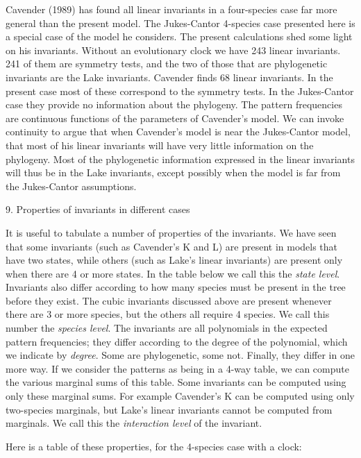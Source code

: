 Cavender (1989) has found all linear invariants in a four-species case far more
general than the present model.  The Jukes-Cantor 4-species case presented 
here is a special case of the model he considers.  The present calculations
shed some light on his invariants.  Without an evolutionary clock we have
243 linear invariants.  241 of them are symmetry tests, and the two of those 
that are phylogenetic invariants are the Lake invariants.  Cavender
finds 68 linear invariants.  In the
present case most of these correspond to the symmetry tests.  In the
Jukes-Cantor
case they provide no information about the phylogeny.  The pattern 
frequencies are continuous functions of the parameters of Cavender's model.
We can invoke continuity to argue that when Cavender's model is near the
Jukes-Cantor model, that most of his linear invariants will have very little
information on the phylogeny.  Most of the phylogenetic information expressed
in the linear invariants will thus be in the Lake invariants, except possibly
when the model is far from the Jukes-Cantor assumptions.

\bigskip

\centerline{9. Properties of invariants in different cases}
\medskip

It is useful to tabulate a number of properties of the invariants.  We
have seen that some invariants (such as Cavender's K and L) are present
in models that have two states, while others (such as Lake's linear
invariants) are present only when there are 4 or more states.  In the table
below we call this the {\it state level}.  Invariants also differ according
to how many species must be present in the tree before they exist.  The
cubic invariants discussed above are present whenever there are 3 or more
species, but the others all require 4 species.  We call this number the
{\it species level}.  The invariants are all polynomials in the expected
pattern frequencies; they differ according to the degree of the polynomial,
which we indicate by {\it degree}.  Some are phylogenetic, some not.  Finally,
they differ in one more way.  If we consider the patterns as being in a 4-way
table, we can compute the various marginal sums of this table.  Some 
invariants can be computed using only these marginal sums.  For example
Cavender's K can be computed using only two-species marginals, but Lake's
linear invariants cannot be computed from marginals.  We call this the
{\it interaction level} of the invariant.

Here is a table of these properties, for the 4-species case with a clock:
\medskip

